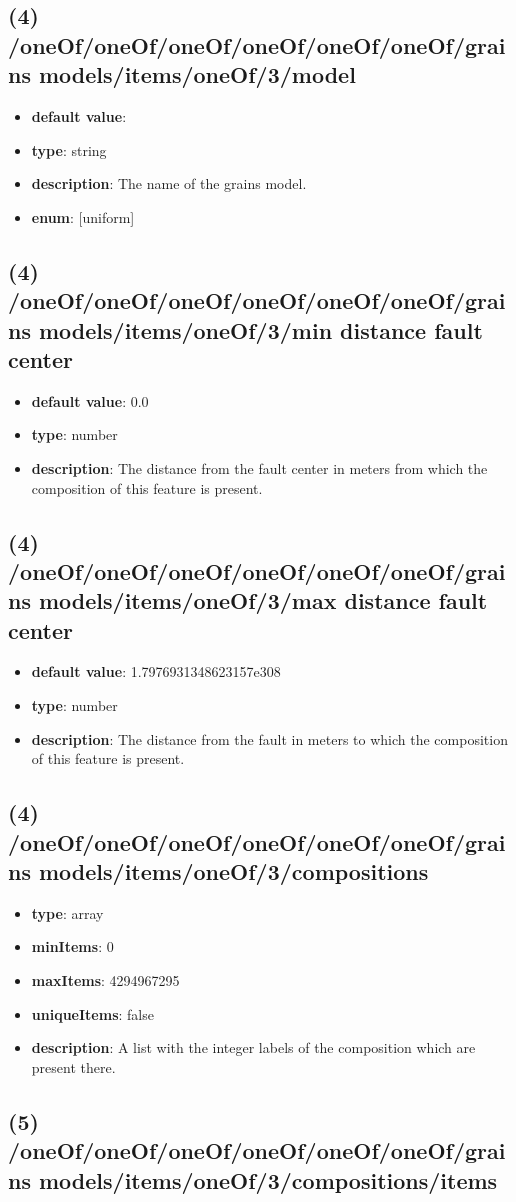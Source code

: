 \subsection{(4) /oneOf/oneOf/oneOf/oneOf/oneOf/oneOf/grains models/items/oneOf/3/model}
\begin{itemize}[leftmargin=4em]\item {\bf default value}: 
\item {\bf type}: string
\item {\bf description}: The name of the grains model.
\item {\bf enum}: [uniform]\end{itemize}\subsection{(4) /oneOf/oneOf/oneOf/oneOf/oneOf/oneOf/grains models/items/oneOf/3/min distance fault center}
\begin{itemize}[leftmargin=4em]\item {\bf default value}: 0.0
\item {\bf type}: number
\item {\bf description}: The distance from the fault center in meters from which the composition of this feature is present.
\end{itemize}\subsection{(4) /oneOf/oneOf/oneOf/oneOf/oneOf/oneOf/grains models/items/oneOf/3/max distance fault center}
\begin{itemize}[leftmargin=4em]\item {\bf default value}: 1.7976931348623157e308
\item {\bf type}: number
\item {\bf description}: The distance from the fault in meters to which the composition of this feature is present.
\end{itemize}\subsection{(4) /oneOf/oneOf/oneOf/oneOf/oneOf/oneOf/grains models/items/oneOf/3/compositions}
\begin{itemize}[leftmargin=4em]\item {\bf type}: array
\item {\bf minItems}: 0
\item {\bf maxItems}: 4294967295
\item {\bf uniqueItems}: false
\item {\bf description}: A list with the integer labels of the composition which are present there.
\end{itemize}\subsection{(5) /oneOf/oneOf/oneOf/oneOf/oneOf/oneOf/grains models/items/oneOf/3/compositions/items}

